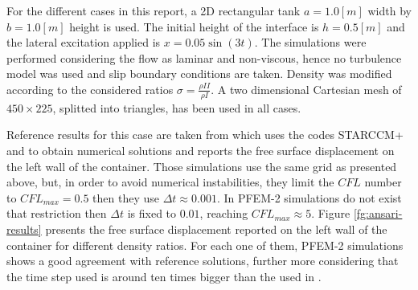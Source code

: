 For the different cases in this report, a 2D rectangular tank $a=1.0[m]$ width by $b=1.0[m]$ height is used. The initial height of the interface is $h=0.5[m]$ and the lateral excitation applied is $x=0.05\sin(3t)$. The simulations were performed considering the
flow as laminar and non-viscous, hence no turbulence model was used and slip boundary conditions are taken. Density was modified according to the considered ratios $\sigma=\frac{\rho{II}}{\rho{I}}$. A two dimensional Cartesian mesh of $450\times225$, splitted into triangles, has been used in all cases.

Reference results for this case are taken from \cite{Goni13} which uses the codes STARCCM+ and \OF to obtain numerical solutions and reports the free surface displacement on the left wall of the container. Those simulations use the same grid as presented above, but, in order to avoid numerical instabilities, they limit the $CFL$ number to $CFL_{max}=0.5$ then they use $\Delta t \approx 0.001$. In PFEM-2 simulations do not exist that restriction then $\Delta t$ is fixed to $0.01$, reaching $CFL_{max}\approx5$.
Figure \ref{fg:ansari-results} presents the free surface displacement reported on the left wall of the container for different density ratios. For each one of them, PFEM-2 simulations shows a good agreement with reference solutions, further more considering that the time step used is around ten times bigger than the used in \cite{Goni13}.


